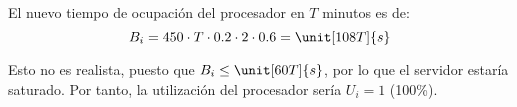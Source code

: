 \begin{ejercicio}
\begin{enumerate}
        El nuevo tiempo de ocupación del procesador en $T$ minutos es de:
        \begin{equation*}
            B_i = 450\cdot T\cdot 0.2 \cdot 2\cdot 0.6 = \unit[108T]{s}
        \end{equation*}
        
        Esto no es realista, puesto que $B_i\leq \unit[60T]{s}$, por lo que el servidor estaría saturado. Por tanto, la utilización del procesador sería $U_i = 1$ (100\%).
    \end{enumerate}
\end{ejercicio}
\begin{comment}
\solucion
    \begin{enumerate}
        \item La utilización del procesador es $0.9$.
        \item Con la mejora introducida la nueva utilización es de $0.36$.
        \item En ese caso la utilización sería $1$ (100\%) ya que nunca puede ser mayor que ese valor y el servidor estaría saturado.
    \end{enumerate}
\end{comment}

